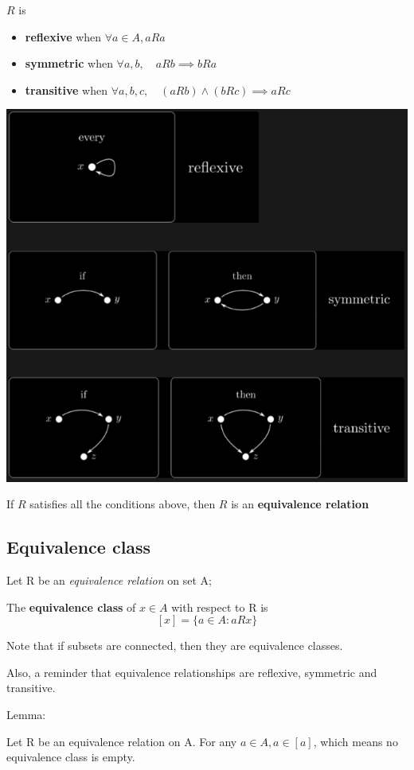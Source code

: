 \documentclass[letterpaper,12pt]{article}
\begin{document}
$R$ is 
\begin{itemize}
    \item \textbf{reflexive} when $\forall a \in A, a R a$
    \item \textbf{symmetric} when $\forall a,b, \quad a R b \implies b R a$
    \item \textbf{transitive} when $\forall a,b,c, \quad (a R b)\land (b R c)\implies a R c$
\end{itemize}
\includegraphics*{./Image/Relation property.png}


If $R$ satisfies all the conditions above, then $R$ is an \textbf{equivalence relation}

\subsection{Equivalence class}

Let R be an \textit{equivalence relation} on set A;

The \textbf{equivalence class} of $x\in A$ with respect to R is 
\[[x]=\{a\in A: a R x\}\]

Note that if subsets are connected, then they are equivalence classes.

Also, a reminder that equivalence relationships are reflexive, symmetric and transitive.

Lemma:

Let R be an equivalence relation on A. For any $a\in A, a\in [a]$, which means no equivalence class is empty. 
\end{document}
